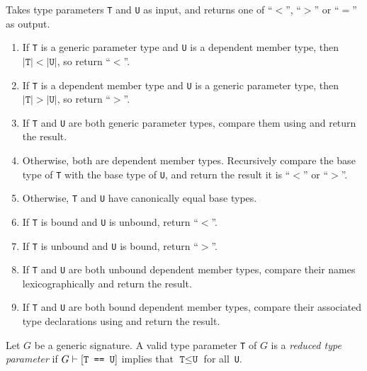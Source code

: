 \documentclass[../generics]{subfiles}
\begin{document}
\begin{algorithm}\label{type parameter order}
Takes type parameters \texttt{T} and \texttt{U} as input, and returns one of ``$<$'', ``$>$'' or ``$=$'' as output.
\begin{enumerate}
\item If \texttt{T} is a generic parameter type and \texttt{U} is a dependent member type, then $|\texttt{T}|<|\texttt{U}|$, so return ``$<$''.
\item If \texttt{T} is a dependent member type and \texttt{U} is a generic parameter type, then $|\texttt{T}|>|\texttt{U}|$, so return ``$>$''.
\item If \texttt{T} and \texttt{U} are both generic parameter types, compare them using  and return the result.
\item Otherwise, both are dependent member types. Recursively compare the base type of \texttt{T} with the base type of \texttt{U}, and return the result it is ``$<$'' or ``$>$''.

\item Otherwise, \texttt{T} and \texttt{U} have canonically equal base types.

\item If \texttt{T} is bound and \texttt{U} is unbound, return ``$<$''.
\item If \texttt{T} is unbound and \texttt{U} is bound, return ``$>$''.
\item If \texttt{T} and \texttt{U} are both unbound dependent member types, compare their names lexicographically and return the result.
\item If \texttt{T} and \texttt{U} are both bound dependent member types, compare their associated type declarations using  and return the result.
\end{enumerate}
\end{algorithm}

\begin{definition}
Let $G$ be a generic signature. A valid type parameter \texttt{T} of $G$ is a \emph{reduced type parameter} if $G\vdash[\texttt{T == U}]$ implies that $\texttt{T}\leq\texttt{U}$ for all~\texttt{U}.
\end{definition}
\end{document}
